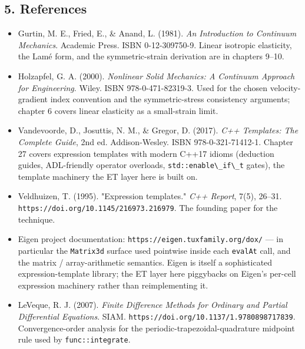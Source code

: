 \subsection{5. References}\label{phase15-refs}

\begin{itemize}
\tightlist
\item
  Gurtin, M. E., Fried, E., \& Anand, L. (1981). \emph{An Introduction
  to Continuum Mechanics}. Academic Press. ISBN 0-12-309750-9. Linear
  isotropic elasticity, the Lamé form, and the symmetric-strain
  derivation are in chapters 9--10.
\item
  Holzapfel, G. A. (2000). \emph{Nonlinear Solid Mechanics: A Continuum
  Approach for Engineering}. Wiley. ISBN 978-0-471-82319-3. Used for
  the chosen velocity-gradient index convention and the symmetric-stress
  consistency arguments; chapter 6 covers linear elasticity as a
  small-strain limit.
\item
  Vandevoorde, D., Josuttis, N. M., \& Gregor, D. (2017).
  \emph{C++ Templates: The Complete Guide}, 2nd ed. Addison-Wesley.
  ISBN 978-0-321-71412-1. Chapter 27 covers expression templates with
  modern C++17 idioms (deduction guides, ADL-friendly operator
  overloads, \passthrough{\lstinline!std::enable\_if\_t!} gates), the
  template machinery the ET layer here is built on.
\item
  Veldhuizen, T. (1995). "Expression templates." \emph{C++ Report},
  7(5), 26--31. \texttt{https://doi.org/10.1145/216973.216979}. The
  founding paper for the technique.
\item
  Eigen project documentation: \texttt{https://eigen.tuxfamily.org/dox/}
  --- in particular the \passthrough{\lstinline!Matrix3d!} surface
  used pointwise inside each
  \passthrough{\lstinline!evalAt!} call, and the matrix /
  array-arithmetic semantics. Eigen is itself a sophisticated
  expression-template library; the ET layer here piggybacks on Eigen's
  per-cell expression machinery rather than reimplementing it.
\item
  LeVeque, R. J. (2007). \emph{Finite Difference Methods for Ordinary
  and Partial Differential Equations}. SIAM.
  \texttt{https://doi.org/10.1137/1.9780898717839}. Convergence-order
  analysis for the periodic-trapezoidal-quadrature midpoint rule used
  by \passthrough{\lstinline!func::integrate!}.
\end{itemize}
